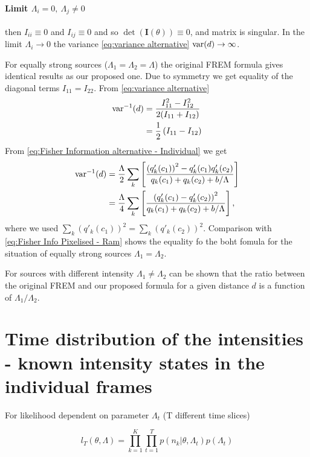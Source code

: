 \paragraph*{Limit $\Lambda_i=0,\ \Lambda_j\neq0$}
then $I_{ii}\equiv0$ and $I_{ij}\equiv0$ and so $\det(\bm{I}(\theta))\equiv0$, and matrix is singular. In the limit $\Lambda_i\rightarrow0$ the
variance \autoref{eq:variance alternative} $\mathrm{var}(d)\rightarrow\infty$. 


For equally strong sources ($\Lambda_1= \Lambda_2=\Lambda$) the original FREM formula gives identical results as our proposed one. Due to symmetry we get equality of the diagonal terms $I_{11}=I_{22}$. From \autoref{eq:variance alternative}
\begin{alignat}{1}
	\mathrm{var}^{-1}(d)
	&=\frac{I_{11}^2-I_{12}^2}{2(I_{11}+I_{12})}\nonumber\\
	&=\frac{1}{2}\left(I_{11}-I_{12}\right)
\end{alignat}
%
From  \autoref{eq:Fisher Information alternative - Individual} we get
\begin{alignat}{2}
	\mathrm{var}^{-1}(d)
	&=\frac{\Lambda}{2}\sum_k\left[\frac{\left(q'_k(c_1)\right)^2-q'_k(c_1)q'_k(c_2)}{q_k(c_1)+q_k(c_2)+b/\Lambda} \right]\nonumber\\
	&=\frac{\Lambda}{4}\sum_k\left[\frac{\left(q'_k(c_1)-q'_k(c_2)\right)^2}{q_k(c_1)+q_k(c_2)+b/\Lambda} \right],
\end{alignat}
% 
where we used $\sum_k\left(q'_k(c_1)\right)^2=\sum_k\left(q'_k(c_2)\right)^2$. Comparison with \autoref{eq:Fisher Info Pixelised - Ram} shows the equality fo the boht fomula for the situation of equally strong sources $\Lambda_1=\Lambda_2$.

For sources with different intensity $\Lambda_1\neq\Lambda_2$ can be shown that the ratio between the original FREM and our proposed formula for a given distance $d$ is a function of $\Lambda_1/\Lambda_2$. 


\section{Time distribution of the intensities - known intensity states in the individual frames\label{sec:Appendix - blinking not integrated}}
For likelihood dependent on parameter $\Lambda_t$ (T different time slices)

\begin{equation}
	l_T(\theta,\Lambda)=\prod_{k=1}^K\prod_{t=1}^Tp(n_k|\theta,\Lambda_t)p(\Lambda_t)
\end{equation}

